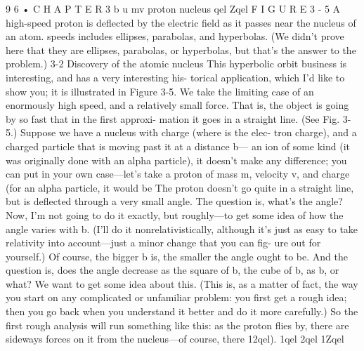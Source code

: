 \documentclass[10pt,oneside]{article}
\begin{document}
9 6 • C H A P T E R  3 b u mv proton nucleus qel Zqel F I G U R E  3 - 5 A high-speed proton is deflected by the electric field as it passes near the nucleus of an atom. speeds includes ellipses, parabolas, and hyperbolas. (We didn’t prove here that they are ellipses, parabolas, or hyperbolas, but that’s the answer to the problem.) 3-2 Discovery of the atomic nucleus This hyperbolic orbit business is interesting, and has a very interesting his- torical application, which I’d like to show you; it is illustrated in Figure 3-5. We take the limiting case of an enormously high speed, and a relatively small force. That is, the object is going by so fast that in the first approxi- mation it goes in a straight line. (See Fig. 3-5.) Suppose we have a nucleus with charge (where is the elec- tron charge), and a charged particle that is moving past it at a distance b--- an ion of some kind (it was originally done with an alpha particle), it doesn’t make any difference; you can put in your own case---let’s take a proton of mass m, velocity v, and charge (for an alpha particle, it would be The proton doesn’t go quite in a straight line, but is deflected through a very small angle. The question is, what’s the angle? Now, I’m not going to do it exactly, but roughly---to get some idea of how the angle varies with b. (I’ll do it nonrelativistically, although it’s just as easy to take relativity into account---just a minor change that you can fig- ure out for yourself.) Of course, the bigger b is, the smaller the angle ought to be. And the question is, does the angle decrease as the square of b, the cube of b, as b, or what? We want to get some idea about this. (This is, as a matter of fact, the way you start on any complicated or unfamiliar problem: you first get a rough idea; then you go back when you understand it better and do it more carefully.) So the first rough analysis will run something like this: as the proton flies by, there are sideways forces on it from the nucleus---of course, there 12qel). 1qel 2qel 1Zqel\par
\end{document}
